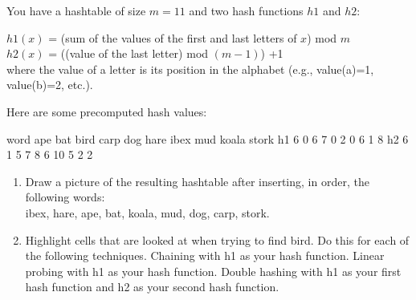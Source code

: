 You have a hashtable of size $m=11$ and two hash functions $h1$ and $h2$:

$h1(x)$ = (sum of the values of the first and last letters of $x$) mod $m$ \\
$h2(x)$ = ((value of the last letter) mod $(m-1)$) +1  \\

where the value of a letter is its position in the alphabet
(e.g., value(a)=1, value(b)=2, etc.).  

Here are some precomputed hash values: 

word ape bat bird carp dog hare ibex mud koala stork 
h1 6 0 6 7 0 2 0 6 1 8 
h2 6 1 5 7 8 6 10 5 2 2

\begin{enumerate}
\item  Draw a picture of the resulting hashtable after inserting, in
order, the following words: \\

ibex, hare, ape, bat, koala, mud, dog, carp, stork.

\item  Highlight cells that are looked at when trying to find bird. Do
this for each of the following techniques.  Chaining with h1 as your
hash function.  Linear probing with h1 as your hash function.  Double
hashing with h1 as your first hash function and h2 as your second hash
function.
\end{enumerate}
